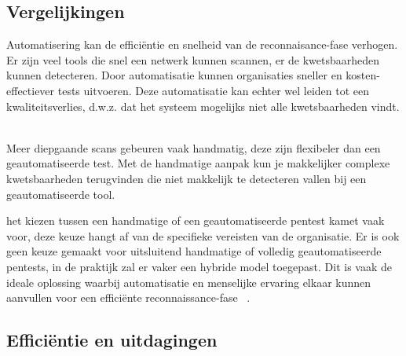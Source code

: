 \subsection{Vergelijkingen}

Automatisering kan de efficiëntie en snelheid van de reconnaisance-fase verhogen. Er zijn veel tools die snel een netwerk kunnen scannen, 
er de kwetsbaarheden kunnen detecteren. Door automatisatie kunnen 
organisaties sneller en kosten-effectiever tests uitvoeren. Deze automatisatie kan echter wel leiden tot een kwaliteitsverlies, 
d.w.z. dat het systeem mogelijks niet alle kwetsbaarheden vindt. ~\autocite{peris}

Meer diepgaande scans gebeuren vaak handmatig, deze zijn flexibeler dan een geautomatiseerde test. 
Met de handmatige aanpak kun je makkelijker complexe kwetsbaarheden terugvinden die niet makkelijk te detecteren vallen bij 
een geautomatiseerde tool.~\autocite{techtarget} 

het kiezen tussen een handmatige of een geautomatiseerde pentest kamet vaak voor, deze keuze hangt af van de specifieke  
vereisten van de organisatie. Er is ook geen keuze gemaakt voor uitsluitend handmatige of volledig geautomatiseerde pentests, in de praktijk zal er vaker een hybride model toegepast.
Dit is vaak de ideale oplossing waarbij automatisatie en menselijke ervaring elkaar kunnen 
aanvullen voor een efficiënte reconnaissance-fase ~\autocite{techtarget}.

\subsection{Efficiëntie en uitdagingen}



